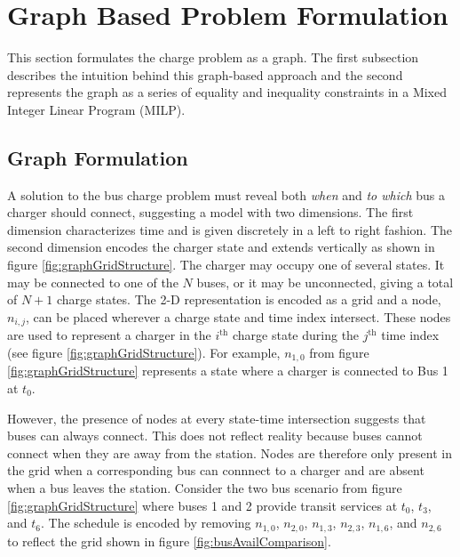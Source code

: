 \section{Graph Based Problem Formulation}
This section formulates the charge problem as a graph. The first subsection describes the intuition behind this graph-based approach and the second represents the graph as a series of equality and inequality constraints in a Mixed Integer Linear Program (MILP).  
\subsection{Graph Formulation}
A solution to the bus charge problem must reveal both \textit{when} and \textit{to which} bus a charger should connect, suggesting a model with two dimensions. The first dimension characterizes time and is given discretely in a left to right fashion. The second dimension encodes the charger state and extends vertically as shown in figure \ref{fig:graphGridStructure}.  The charger may occupy one of several states.  It may be connected to one of the $N$ buses, or it may be unconnected, giving a total of $N + 1$ charge states. The 2-D representation is encoded as a grid and a node, $n_{i,j}$, can be placed wherever a charge state and time index intersect. These nodes are used to represent a charger in the $i^{\text{th}}$ charge state during the $j^{\text{th}}$ time index (see figure \ref{fig:graphGridStructure}). For example, $n_{1,0}$ from figure \ref{fig:graphGridStructure} represents a state where a charger is connected to Bus 1 at $t_0$. 
\par However, the presence of nodes at every state-time intersection suggests that buses can always connect.  This does not reflect reality because buses cannot connect when they are away from the station. Nodes are therefore only present in the grid when a corresponding bus can connnect to a charger and are absent when a bus leaves the station. Consider the two bus scenario from figure \ref{fig:graphGridStructure} where buses 1 and 2 provide transit services at $t_0$, $t_3$, and $t_6$. The schedule is encoded by removing $n_{1,0}$, $n_{2,0}$, $n_{1,3}$,  $n_{2,3}$, $n_{1,6}$, and $n_{2,6}$ to reflect the grid shown in figure \ref{fig:busAvailComparison}. 
